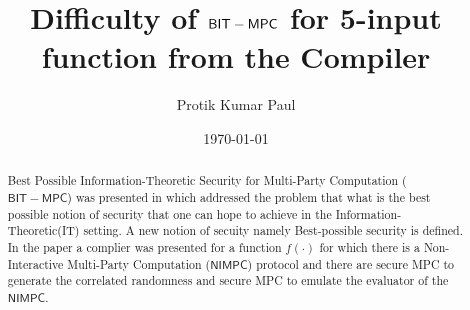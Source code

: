 \documentclass[runningheads]{llncs}
\title{Difficulty of $\BITMPC$ for 5-input function from the Compiler}
\author{{Protik Kumar Paul}}
\institute{IISc, CSA}
\date{\today}
\def\NIMPC{\mathsf{NIMPC}}
\def\BITMPC{\mathsf{BIT-MPC}}
\begin{document}
\maketitle

\begin{abstract}
Best Possible Information-Theoretic Security for Multi-Party Computation ($\BITMPC$) was presented in \cite{BITMPC} which addressed the problem that what is the best possible notion of security that one can hope to achieve in the Information-Theoretic(IT) setting. A new notion of secuity namely Best-possible security is defined. In the paper a complier was presented for a function $f(\cdot)$ for which there is a Non-Interactive Multi-Party Computation ($\NIMPC$) \cite{NIMPC} protocol and there are secure MPC to generate the correlated randomness and secure MPC to emulate the evaluator of the $\NIMPC$. 
\end{abstract}









\end{document}
